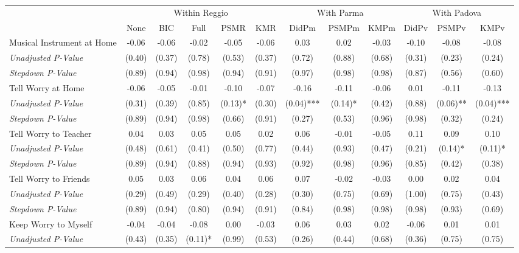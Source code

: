 \begin{tabular}{l c c c c c c c c c c c}
\toprule
& \multicolumn{5}{c}{Within Reggio} & \multicolumn{3}{c}{With Parma} & \multicolumn{3}{c}{With Padova} \\\cmidrule(lr){2-6} \cmidrule(lr){7-9} \cmidrule(lr){10-12}
 & None & BIC & Full & PSMR & KMR & DidPm & PSMPm & KMPm & DidPv & PSMPv & KMPv \\
\midrule
Musical Instrument at Home & -0.06 & -0.06 & -0.02 & -0.05 & -0.06 & 0.03 & 0.02 & -0.03 & -0.10 & -0.08 & -0.08 \\
\quad \textit{Unadjusted P-Value} & (0.40) & (0.37) & (0.78) & (0.53) & (0.37) & (0.72) & (0.88) & (0.68) & (0.31) & (0.23) & (0.24) \\
\quad \textit{Stepdown P-Value} & (0.89) & (0.94) & (0.98) & (0.94) & (0.91) & (0.97) & (0.98) & (0.98) & (0.87) & (0.56) & (0.60) \\
Tell Worry at Home & -0.06 & -0.05 & -0.01 & -0.10 & -0.07 & -0.16 & -0.11 & -0.06 & 0.01 & -0.11 & -0.13 \\
\quad \textit{Unadjusted P-Value} & (0.31) & (0.39) & (0.85) & (0.13)* & (0.30) & (0.04)*** & (0.14)* & (0.42) & (0.88) & (0.06)** & (0.04)*** \\
\quad \textit{Stepdown P-Value} & (0.89) & (0.94) & (0.98) & (0.66) & (0.91) & (0.27) & (0.53) & (0.96) & (0.98) & (0.32) & (0.24) \\
Tell Worry to Teacher & 0.04 & 0.03 & 0.05 & 0.05 & 0.02 & 0.06 & -0.01 & -0.05 & 0.11 & 0.09 & 0.10 \\
\quad \textit{Unadjusted P-Value} & (0.48) & (0.61) & (0.41) & (0.50) & (0.77) & (0.44) & (0.93) & (0.47) & (0.21) & (0.14)* & (0.11)* \\
\quad \textit{Stepdown P-Value} & (0.89) & (0.94) & (0.88) & (0.94) & (0.93) & (0.92) & (0.98) & (0.96) & (0.85) & (0.42) & (0.38) \\
Tell Worry to Friends & 0.05 & 0.03 & 0.06 & 0.04 & 0.06 & 0.07 & -0.02 & -0.03 & 0.00 & 0.02 & 0.04 \\
\quad \textit{Unadjusted P-Value} & (0.29) & (0.49) & (0.29) & (0.40) & (0.28) & (0.30) & (0.75) & (0.69) & (1.00) & (0.75) & (0.43) \\
\quad \textit{Stepdown P-Value} & (0.89) & (0.94) & (0.80) & (0.94) & (0.91) & (0.84) & (0.98) & (0.98) & (0.98) & (0.93) & (0.69) \\
Keep Worry to Myself & -0.04 & -0.04 & -0.08 & 0.00 & -0.03 & 0.06 & 0.03 & 0.02 & -0.06 & 0.01 & 0.01 \\
\quad \textit{Unadjusted P-Value} & (0.43) & (0.35) & (0.11)* & (0.99) & (0.53) & (0.26) & (0.44) & (0.68) & (0.36) & (0.75) & (0.75) \\

\end{tabular}
